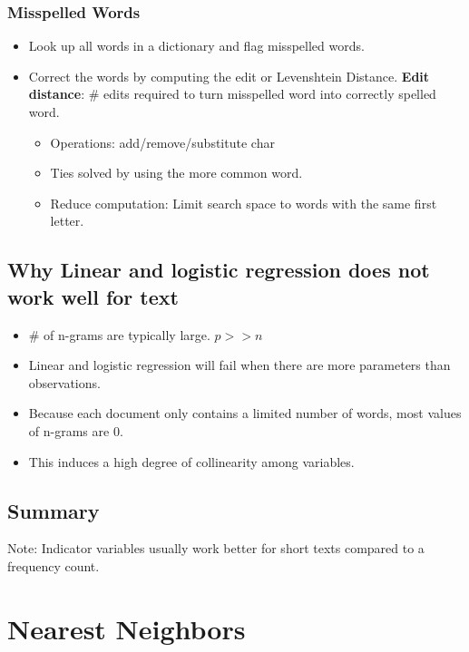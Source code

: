\documentclass[12pt, oneside]{article}
\begin{document}
\subsubsection{Misspelled Words}
\begin{itemize}
    \item Look up all words in a dictionary and flag misspelled words. 
    \item Correct the words by computing the edit or Levenshtein Distance. 
    \textbf{Edit distance}: \# edits required to turn misspelled word into correctly spelled word. 
    \begin{itemize}
        \item Operations: add/remove/substitute char
        \item Ties solved by using the more common word. 
        \item Reduce computation: Limit search space to words with the same first letter. 
    \end{itemize}
\end{itemize}

\subsection{Why Linear and logistic regression does not work well for text}
\begin{itemize}
    \item \# of n-grams are typically large. $p >> n$
    \item Linear and logistic regression will fail when there are more parameters than observations. 
    \item Because each document only contains a limited number of words, most values of n-grams are 0. 
    \item This induces a high degree of collinearity among variables. 
\end{itemize}
\subsection{Summary}
Note: Indicator variables usually work better for short texts compared to a frequency count. 

\newpage
\section{Nearest Neighbors}
\end{document}
